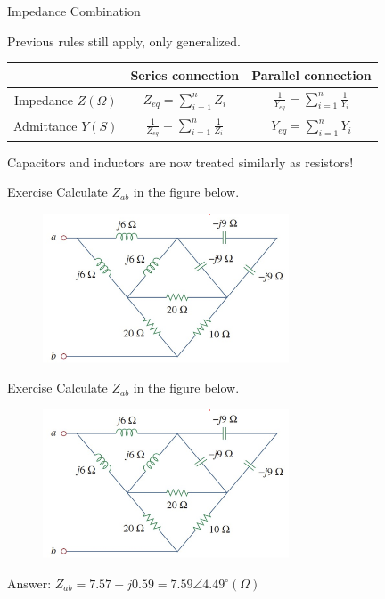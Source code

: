 \documentclass{beamer}
\begin{document}
\begin{frame}{Impedance Combination}

Previous rules still apply, only generalized.

\begin{table}[]
    \centering
    \begin{tabular}{ccc}
        \toprule
        & Series connection& Parallel connection \\
        \midrule
         Impedance $Z (\Omega)$ & $Z_{eq} = \sum_{i=1}^{n}Z_i$ & $\frac{1}{Y_{eq}} = \sum_{i=1}^{n}\frac{1}{Y_i}$\\
         Admittance $Y (S)$ & $\frac{1}{Z_{eq}} = \sum_{i=1}^{n}\frac{1}{Z_i}$ & $Y_{eq} = \sum_{i=1}^nY_i$ \\
         \bottomrule
    \end{tabular}
\end{table}

Capacitors and inductors are now treated similarly as resistors!
    
\end{frame}


\begin{frame}{Exercise}
Calculate $Z_{ab}$ in the figure below.

\begin{figure}
    \centering
    \includegraphics[width=0.65\textwidth]{img_ch9/exercise.png}
\end{figure}
    
\end{frame}

\begin{frame}{Exercise}
Calculate $Z_{ab}$ in the figure below.

\begin{figure}
    \centering
    \includegraphics[width=0.65\textwidth]{img_ch9/exercise.png}
\end{figure}

Answer: $Z_{ab} = 7.57+j0.59=7.59\angle 4.49^{\circ} (\Omega)$
    
\end{frame}
\end{document}
